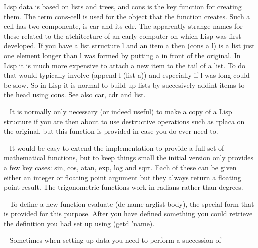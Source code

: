 \begin{description}
Lisp data is based on lists and trees, and {\tx cons} is the key function
for creating them. The term {\tx cons}-cell is used for the object that
the function creates. Such a cell has two componente, is {\tx car} and
its {\tx cdr}. The apparently strange names for these related to the
atchitecture of an early computer on which Lisp was first developed.
If you have a list structure {\tx l} and an item {\tx a} then
{\tx (cons a l)} is a list just one element longer than {\tx l} was formed
by putting {\tx a} in front of the original. In Lisp it is much more
expensive to attach a new item to the tail of a list. To do that
would typically involve {\tx (append l (list a))} and especially if {\tx l}
was long could be slow. So in Lisp it is normal to build up lists by
succesively addint items to the head using {\tx cons}. See also {\tx car},
{\tx cdr} and {\tx list}.
\item[{\tx copy~~~~~~~~~} \hspace{1cm} {\em function 1 arg}]~\newline
It is normally only necessary (or indeed useful) to make a copy of a Lisp
structure if you are then about to use destructive operations such as
{\tx rplaca} on the original, but this function is provided in case you
do ever need to.
\item[{\tx cos~~~~~~~~~~} \hspace{1cm} {\em function 1 arg}]~\newline
It would be easy to extend the \vsl{} implementation to provide a full set
of mathematical functions, but to keep things small the initial version only
provides a few key cases: {\tx sin}, {\tx cos}, {\tx atan},
{\tx exp}, {\tx log} and {\tx sqrt}. Each of these can be given
either an integer or floating point argument but they always return a floating
point result. The trigonometric functions work in radians rather than
degrees.
\item[{\tx de~~~~~~~~~~~} \hspace{1cm} {\em special form}]~\newline
To define a new function evaluate {\tx (de name arglist body)}, the special
form that is provided for this purpose. After you have defined something
you could retrieve the definition you had set up using {\tx (getd 'name)}.
\item[{\tx deflist~~~~~~} \hspace{1cm} {\em function 2 args}]~\newline
Sometimes when setting up data you need to perform a succession of

\end{description}
